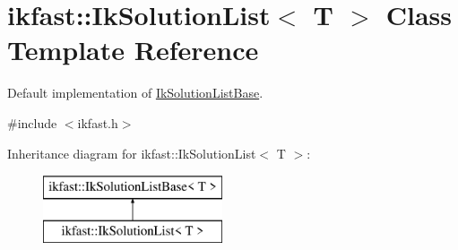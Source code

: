 \hypertarget{classikfast_1_1IkSolutionList}{\section{ikfast\-:\-:Ik\-Solution\-List$<$ T $>$ Class Template Reference}
\label{classikfast_1_1IkSolutionList}
}


Default implementation of \hyperlink{classikfast_1_1IkSolutionListBase}{Ik\-Solution\-List\-Base}.  




{\ttfamily \#include $<$ikfast.\-h$>$}

Inheritance diagram for ikfast\-:\-:Ik\-Solution\-List$<$ T $>$\-:\begin{figure}[H]
\begin{center}
\leavevmode
\includegraphics[height=2.000000cm]{classikfast_1_1IkSolutionList}
\end{center}
\end{figure}
